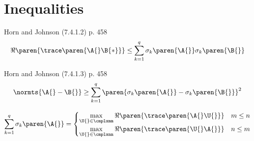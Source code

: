 \section{Inequalities}

Horn and Johnson (7.4.1.2) p. 458
\begin{equation}
  \Re \paren{\trace \paren{\A{}\B{*}}} \le \sum_{k=1}^{q} \sigma_{k}\paren{\A{}} \sigma_{k}\paren{\B{}}
\end{equation}

Horn and Johnson (7.4.1.3) p. 458
\begin{equation}
  \normts{\A{} - \B{}} \ge \sum_{k=1}^{q} \paren{\sigma_{k}\paren{\A{}} - \sigma_{k}\paren{\B{}}}^{2}
\end{equation}

\begin{equation}
  \sum_{k=1}^{q} \sigma_{k}\paren{\A{}} = 
  \begin{cases}
    \displaystyle\max_{\U{}\in\cmplxmm} \Re \paren{\trace \paren{\A{}\U{}}} & m\le n \\
    \displaystyle\max_{\U{}\in\cmplxnn} \Re \paren{\trace \paren{\U{}\A{}}} & n\le m
  \end{cases}
\end{equation}



\endinput
